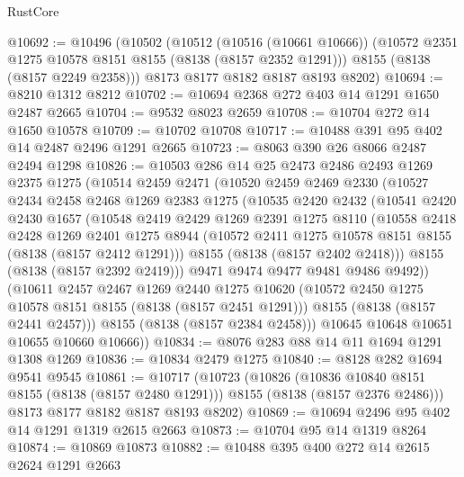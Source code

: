 \begin{lexlean}{RustCore}
\begin{coremodule}
@10692 := @10496
    (@10502
      (@10512
        (@10516 (@10661 @10666))
        (@10572 @2351 @1275 @10578 @8151 @8155 (@8138 (@8157 @2352 @1291)))
        @8155
        (@8138 (@8157 @2249 @2358)))
      @8173
      @8177
      @8182
      @8187
      @8193
      @8202)
@10694 := @8210 @1312 @8212
@10702 := @10694 @2368 @272 @403 @14 @1291 @1650 @2487 @2665
@10704 := @9532 @8023 @2659
@10708 := @10704 @272 @14 @1650 @10578
@10709 := @10702 @10708
@10717 := @10488 @391 @95 @402 @14 @2487 @2496 @1291 @2665
@10723 := @8063 @390 @26 @8066 @2487 @2494 @1298
@10826 := @10503
    @286
    @14
    @25
    @2473
    @2486
    @2493
    @1269
    @2375
    @1275
    (@10514
      @2459
      @2471
      (@10520
        @2459
        @2469
        @2330
        (@10527
          @2434
          @2458
          @2468
          @1269
          @2383
          @1275
          (@10535
            @2420
            @2432
            (@10541
              @2420
              @2430
              @1657
              (@10548
                @2419
                @2429
                @1269
                @2391
                @1275
                @8110
                (@10558
                  @2418
                  @2428
                  @1269
                  @2401
                  @1275
                  @8944
                  (@10572 @2411 @1275 @10578 @8151 @8155 (@8138 (@8157 @2412 @1291)))
                  @8155
                  (@8138 (@8157 @2402 @2418)))
                @8155
                (@8138 (@8157 @2392 @2419)))
              @9471
              @9474
              @9477
              @9481
              @9486
              @9492))
          (@10611
            @2457
            @2467
            @1269
            @2440
            @1275
            @10620
            (@10572 @2450 @1275 @10578 @8151 @8155 (@8138 (@8157 @2451 @1291)))
            @8155
            (@8138 (@8157 @2441 @2457)))
          @8155
          (@8138 (@8157 @2384 @2458)))
        @10645
        @10648
        @10651
        @10655
        @10660
        @10666))
@10834 := @8076 @283 @88 @14 @11 @1694 @1291 @1308 @1269
@10836 := @10834 @2479 @1275
@10840 := @8128 @282 @1694 @9541 @9545
@10861 := @10717
    (@10723
      (@10826
        (@10836 @10840 @8151 @8155 (@8138 (@8157 @2480 @1291)))
        @8155
        (@8138 (@8157 @2376 @2486)))
      @8173
      @8177
      @8182
      @8187
      @8193
      @8202)
@10869 := @10694 @2496 @95 @402 @14 @1291 @1319 @2615 @2663
@10873 := @10704 @95 @14 @1319 @8264
@10874 := @10869 @10873
@10882 := @10488 @395 @400 @272 @14 @2615 @2624 @1291 @2663

\end{coremodule}
\end{lexlean}
